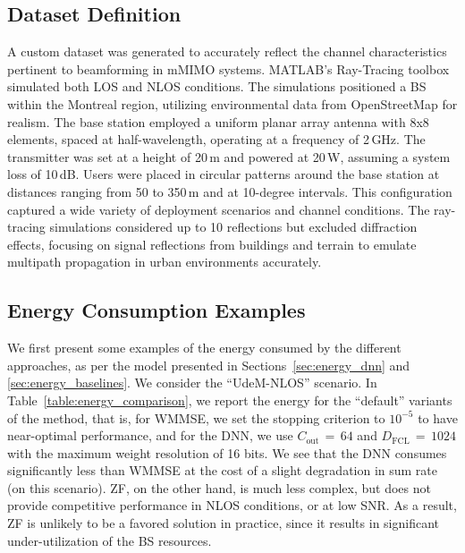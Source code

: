 \subsection{Dataset Definition}
A custom dataset was generated to accurately reflect the channel characteristics pertinent to beamforming in mMIMO systems. MATLAB’s Ray-Tracing toolbox simulated both \gls{LOS} and \gls{NLOS} conditions. The simulations positioned a \gls{BS} within the Montreal region, utilizing environmental data from OpenStreetMap \cite{OpenStreetMap} for realism. The base station employed a uniform planar array antenna with 8x8 elements, spaced at half-wavelength, operating at a frequency of 2\,GHz. The transmitter was set at a height of 20\,m and powered at 20\,W, assuming a system loss of 10\,dB. Users were placed in circular patterns around the base station at distances ranging from 50 to 350\,m and at 10-degree intervals. This configuration captured a wide variety of deployment scenarios and channel conditions. The ray-tracing simulations considered up to 10 reflections but excluded diffraction effects, focusing on signal reflections from buildings and terrain to emulate multipath propagation in urban environments accurately.

\subsection{Energy Consumption Examples}
We first present some examples of the energy consumed by the different approaches, as per the model presented in Sections~\ref{sec:energy_dnn} and \ref{sec:energy_baselines}.
We consider the ``UdeM-NLOS'' scenario.
In Table~\ref{table:energy_comparison}, we report the energy for the ``default'' variants of the method, that is, for \gls{WMMSE}, we set the stopping criterion to $10^{-5}$ to have near-optimal performance, and for the DNN, we use $C_{\text{out}}$\,$=$\,$64$ and $D_{\text{FCL}}$\,$=$\,$1024$ with the maximum weight resolution of 16 bits.
We see that the DNN consumes significantly less than WMMSE at the cost of a slight degradation in sum rate (on this scenario). ZF, on the other hand, is much less complex, but does not provide competitive performance in \gls{NLOS} conditions, or at low \gls{SNR}.
As a result, ZF is unlikely to be a favored solution in practice, since it results in significant under-utilization of the BS resources.





